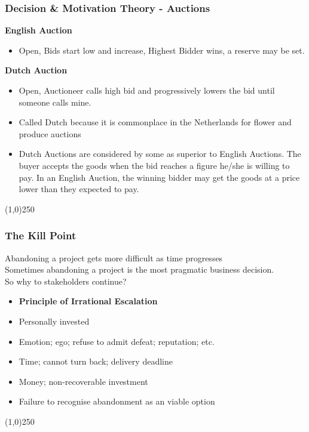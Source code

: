 \begin{frame}
\frametitle{Decision \& Motivation Theory -  Auctions}
\textbf{English Auction}\\
\begin{itemize}
\item Open, Bids start low and increase, Highest Bidder wins, a reserve may be set.
\end{itemize}
\textbf{Dutch Auction}\\
\begin{itemize}
	\item Open, Auctioneer calls high bid and progressively lowers the bid until someone calls mine.
	\item Called Dutch because it is commonplace in the Netherlands for flower and produce auctions
	\item Dutch Auctions are considered by some as superior to English Auctions.  The buyer accepts the goods when the bid reaches a figure he/she is willing to pay.  In an English Auction, the winning bidder may get the goods at a price lower than they expected to pay.
\end{itemize}
\end{frame}
\begin{center}\line(1,0){250}\end{center}




\begin{frame}
\frametitle{The Kill Point}
Abandoning a project gets more difficult as time progresses\\
Sometimes abandoning a project is the most pragmatic business decision.\\
So why to stakeholders continue?\\
\begin{itemize}
\item \textbf{Principle of Irrational Escalation}
\item Personally invested
\item Emotion; ego; refuse to admit defeat; reputation; etc.
\item Time; cannot turn back; delivery deadline
\item Money; non-recoverable investment
\item Failure to recognise abandonment as an viable option
\end{itemize}
\end{frame}
\begin{center}\line(1,0){250}\end{center}



